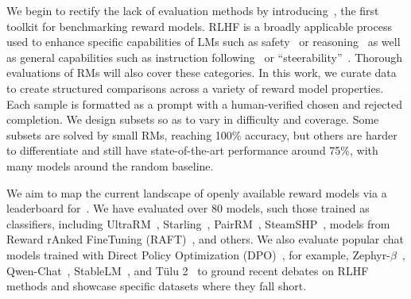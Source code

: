 We begin to rectify the lack of evaluation methods by introducing~\name, the first toolkit for benchmarking reward models. 
RLHF is a broadly applicable process used to enhance specific capabilities of LMs such as safety~\citep{dai2023safe} or reasoning~\citep{lightman2023let, havrilla2024teaching} as well as general capabilities such as instruction following~\citep{ouyang2022training} or ``steerability''~\citep{askell2021general,bai2022training}. 
Thorough evaluations of RMs will also cover these categories. 
In this work, we curate data to create structured comparisons across a variety of reward model properties.
Each sample is formatted as a prompt with a human-verified chosen and rejected completion.
We design subsets so as to vary in difficulty and coverage. 
Some subsets are solved by small RMs, reaching 100\% accuracy, but others are harder to differentiate and still have state-of-the-art performance around 75\%, with many models around the random baseline.

We aim to map the current landscape of openly available reward models via a leaderboard for~\name.
We have evaluated over 80 models, such those trained as classifiers, including UltraRM~\citep{cui2023ultrafeedback}, Starling~\citep{starling2023}, PairRM~\citep{llm-blender-2023}, SteamSHP~\citep{pmlr-v162-ethayarajh22a}, models from Reward rAnked FineTuning (RAFT)~\citep{dong2023raft}, and others. 
We also evaluate popular chat models trained with Direct Policy Optimization (DPO)~\citep{rafailov2023direct}, for example, Zephyr-$\beta$~\citep{tunstall2023zephyr}, Qwen-Chat~\citep{bai2023qwen}, StableLM~\citep{bellagente2024stable}, and T\"ulu 2~\citep{ivison2023camels} to ground recent debates on RLHF methods and showcase specific datasets where they fall short.

